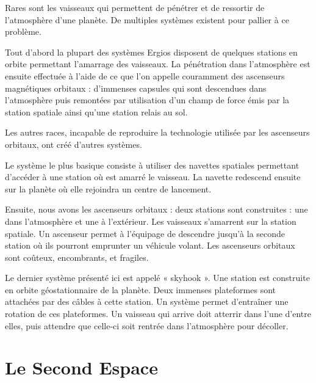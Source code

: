 \begin{multicols}{2}
Rares sont les vaisseaux qui permettent de pénétrer et de ressortir de l’atmosphère d’une planète. De multiples systèmes existent pour pallier à ce problème.

Tout d’abord la plupart des systèmes Ergios disposent de quelques stations en orbite permettant l’amarrage des vaisseaux. La pénétration dans l’atmosphère est ensuite effectuée à l’aide de ce que l’on appelle couramment des ascenseurs magnétiques orbitaux : d’immenses capsules qui sont descendues dans l’atmosphère puis remontées par utilisation d’un champ de force émis par la station spatiale ainsi qu’une station relais au sol. 

Les autres races, incapable de reproduire la technologie utilisée par les ascenseurs orbitaux, ont créé d’autres systèmes.

Le système le plus basique consiste à utiliser des navettes spatiales permettant d’accéder à une station où est amarré le vaisseau. La navette redescend ensuite sur la planète où elle rejoindra un centre de lancement.

Ensuite, nous avons les ascenseurs orbitaux : deux stations sont construites : une dans l’atmosphère et une à l’extérieur. Les vaisseaux s’amarrent sur la station spatiale. Un ascenseur permet à l’équipage de descendre jusqu’à la seconde station où ils pourront emprunter un véhicule volant. Les ascenseurs orbitaux sont coûteux, encombrants, et fragiles.

Le dernier système présenté ici est appelé « skyhook ». Une station est construite en orbite géostationnaire de la planète. Deux immenses plateformes sont attachées par des câbles à cette station. Un système permet d’entraîner une rotation de ces plateformes. Un vaisseau qui arrive doit atterrir dans l’une d'entre elles, puis attendre que celle-ci soit rentrée dans l’atmosphère pour décoller. 

\section{Le Second Espace}



\end{multicols}
